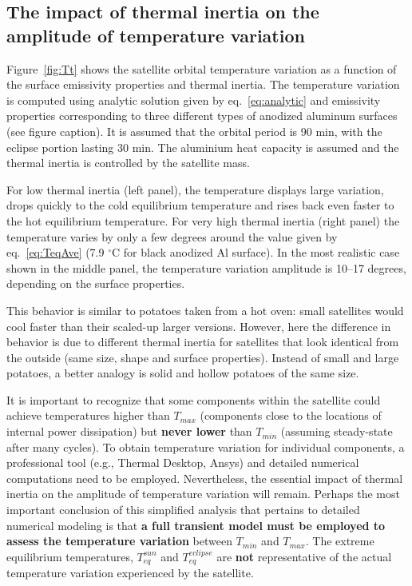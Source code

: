 \documentclass[]{aastex62}
\begin{document}
\subsection{The impact of thermal inertia on the amplitude of temperature variation} 

Figure~\ref{fig:Tt} shows the satellite orbital temperature variation as a function of the surface emissivity
properties and thermal inertia. The temperature variation is computed using analytic solution given by
eq.~\ref{eq:analytic} and emissivity properties corresponding to three different types of anodized aluminum 
surfaces (see figure caption). It is assumed that the orbital period is 90 min, with the eclipse portion lasting 
30 min. The aluminium heat capacity is assumed and the thermal inertia is controlled by the satellite mass. 

For low thermal inertia (left panel), the temperature displays large variation, drops quickly to the cold 
equilibrium temperature and rises back even faster to the hot equilibrium temperature. For very high
thermal inertia (right panel) the temperature varies by only a few degrees around the value given by 
eq.~\ref{eq:TeqAve} (7.9 $^\circ$C for black anodized Al surface). In the most realistic case shown in the 
middle panel, the temperature variation amplitude is 10--17 degrees, depending on the surface properties. 

This behavior is similar to potatoes taken from a hot oven: small satellites would cool faster 
than their scaled-up larger versions. However, here the difference in behavior is due to different 
thermal inertia for satellites that look identical from the outside (same size, shape and surface properties). 
Instead of small and large potatoes, a better analogy is solid and hollow potatoes of the same size.

It is important to recognize that some components within the satellite could achieve temperatures 
higher than $T_{max}$ (components close to the locations of internal power dissipation) but {\bf never
lower} than $T_{min}$  (assuming steady-state after many cycles). To obtain temperature variation for 
individual components, a professional tool (e.g., Thermal Desktop, Ansys) and detailed numerical 
computations need to be employed. Nevertheless, the essential impact of thermal inertia on the 
amplitude of temperature variation will remain. Perhaps the most important conclusion of this 
simplified analysis that pertains to detailed numerical modeling is that {\bf a full transient model
must be employed to assess the temperature variation} between $T_{min}$ and $T_{max}$. The 
extreme equilibrium temperatures, $T_{eq}^{sun}$ and $T_{eq}^{eclipse}$ are {\bf not} representative of the
actual temperature variation experienced by the satellite. 
\end{document}
